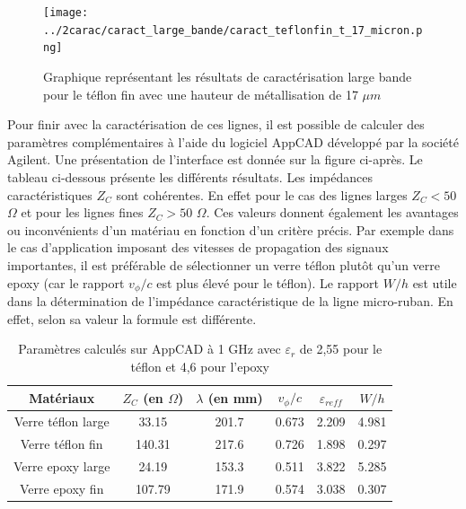 \documentclass[french]{article}
\begin{document}
\begin{figure}[H]
	\centering
	\texttt{[image: ../2carac/caract\_large\_bande/caract\_teflonfin\_t\_17\_micron.png]}
	\caption{Graphique représentant les résultats de caractérisation large bande pour le téflon fin avec une hauteur de métallisation de 17 $\mu m$}
	\label{fig:amelioration_teflon_fin}
\end{figure}

Pour finir avec la caractérisation de ces lignes, il est possible de calculer des paramètres complémentaires à l'aide du logiciel AppCAD développé par la société Agilent. Une présentation de l'interface est donnée sur la figure ci-après. Le tableau ci-dessous présente les différents résultats. Les impédances caractéristiques $Z_C$ sont cohérentes. En effet pour le cas des lignes larges $Z_C<50$ $\Omega$ et pour les lignes fines $Z_C>50$ $\Omega$. Ces valeurs donnent également les avantages ou inconvénients d'un matériau en fonction d'un critère précis. Par exemple dans le cas d'application imposant des vitesses de propagation des signaux importantes, il est préférable de sélectionner un verre téflon plutôt qu'un verre epoxy (car le rapport $v_{\phi}/c$ est plus élevé pour le téflon). Le rapport $W/h$ est utile dans la détermination de l'impédance caractéristique de la ligne micro-ruban. En effet, selon sa valeur la formule est différente. 

\begin{table}[H]
	\centering
	\begin{tabular}{|c|c|c|c|c|c|}
		\hline
		Matériaux & $Z_C$ (en $\Omega$) & $\lambda$ (en mm) & $v_{\phi}/c$ & $\varepsilon_{reff}$ & $W/h$\\
		\hline
		Verre téflon large & 33.15 & 201.7 & 0.673 & 2.209 & 4.981\\
		\hline
		Verre téflon fin & 140.31 & 217.6 & 0.726 & 1.898 & 0.297\\
		\hline
		Verre epoxy large & 24.19 & 153.3 & 0.511 & 3.822 & 5.285\\
		\hline
		Verre epoxy fin & 107.79 & 171.9 & 0.574 & 3.038 & 0.307\\
		\hline
	\end{tabular}
	\caption{Paramètres calculés sur AppCAD à 1 GHz avec $\varepsilon_r$ de 2,55 pour le téflon et 4,6 pour l'epoxy}
\end{table}
\end{document}
